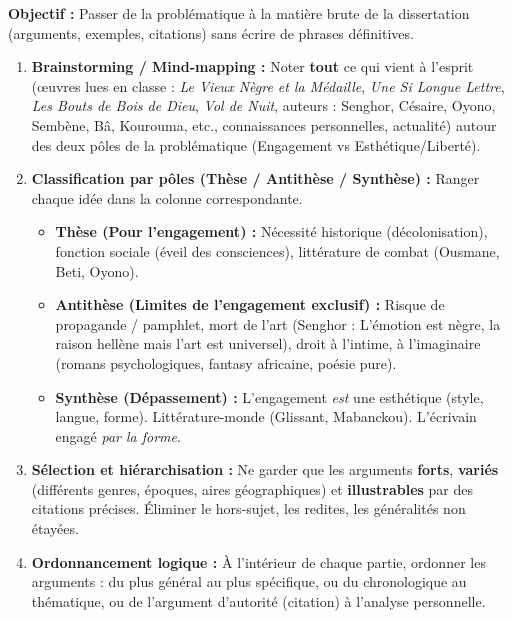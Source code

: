 \documentclass[11pt]{article}
\begin{document}
\begin{methode}
    \textbf{Objectif :} Passer de la problématique à la matière brute de la dissertation (arguments, exemples, citations) sans écrire de phrases définitives.
    \begin{enumerate}
        \item \textbf{Brainstorming / Mind-mapping :} Noter \textbf{tout} ce qui vient à l'esprit (œuvres lues en classe : \emph{Le Vieux Nègre et la Médaille}, \emph{Une Si Longue Lettre}, \emph{Les Bouts de Bois de Dieu}, \emph{Vol de Nuit}, auteurs : Senghor, Césaire, Oyono, Sembène, Bâ, Kourouma, etc., connaissances personnelles, actualité) autour des deux pôles de la problématique (Engagement vs Esthétique/Liberté).
        \item \textbf{Classification par pôles (Thèse / Antithèse / Synthèse) :} Ranger chaque idée dans la colonne correspondante.
            \begin{itemize}
                \item \textbf{Thèse (Pour l'engagement) :} Nécessité historique (décolonisation), fonction sociale (éveil des consciences), littérature de combat (Ousmane, Beti, Oyono).
                \item \textbf{Antithèse (Limites de l'engagement exclusif) :} Risque de propagande / pamphlet, mort de l'art (Senghor : \og L'émotion est nègre, la raison hellène \fg mais l'art est universel), droit à l'intime, à l'imaginaire (romans psychologiques, fantasy africaine, poésie pure).
                \item \textbf{Synthèse (Dépassement) :} L'engagement \emph{est} une esthétique (style, langue, forme). \og Littérature-monde \fg (Glissant, Mabanckou). L'écrivain engagé \emph{par la forme}.
            \end{itemize}
        \item \textbf{Sélection et hiérarchisation :} Ne garder que les arguments \textbf{forts}, \textbf{variés} (différents genres, époques, aires géographiques) et \textbf{illustrables} par des citations précises. Éliminer le hors-sujet, les redites, les généralités non étayées.
        \item \textbf{Ordonnancement logique :} À l'intérieur de chaque partie, ordonner les arguments : du plus général au plus spécifique, ou du chronologique au thématique, ou de l'argument d'autorité (citation) à l'analyse personnelle.
    \end{enumerate}
\end{methode}
\end{document}
